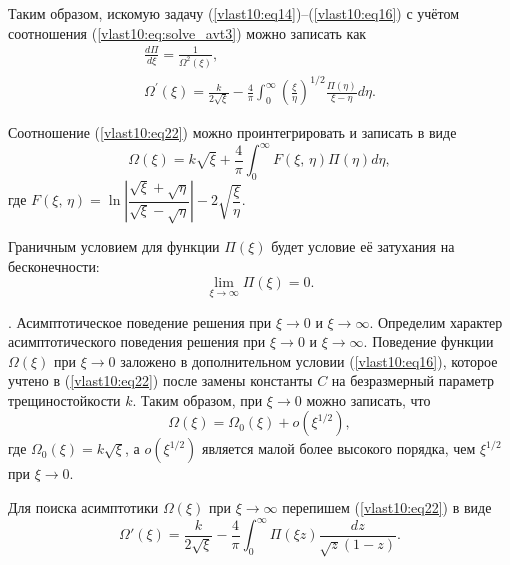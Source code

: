 Таким образом, искомую задачу (\ref{vlast10:eq14})--(\ref{vlast10:eq16}) с учётом соотношения (\ref{vlast10:eq:solve_avt3}) можно записать как
\begin{gather}
\frac{d\Pi}{d\xi}=\frac{1}{\Omega^{2}\left(\xi\right)},\label{vlast10:eq21}\\
\Omega^{\prime}(\xi)=\frac{k}{2\sqrt{\xi}}-\frac{4}{\pi}\int _{0}^{\infty}\left(\frac{\xi}{\eta}\right)^{1/2}\frac{\Pi (\eta)}{\xi-\eta}d\eta.\label{vlast10:eq22}
\end{gather}

Соотношение (\ref{vlast10:eq22}) можно проинтегрировать и записать в виде
\begin{equation}
\Omega(\xi)=k\sqrt{\xi}+\dfrac{4}{\pi}\int _{0}^{\infty}F(\xi,\,\eta)\Pi(\eta)d\eta,\label{vlast10:eq:solve_avt6}
\end{equation}
где $F(\xi,\,\eta)=\ln\left|\dfrac{\sqrt{\xi}+\sqrt{\eta}}{\sqrt{\xi}-\sqrt{\eta}}\right|-2\sqrt{\dfrac{\xi}{\eta}}$.

Граничным условием для функции $\Pi(\xi)$ будет условие её затухания на бесконечности:
\begin{equation}
\lim_{\xi\to\infty}\Pi(\xi)=0.\label{vlast10:eq24}
\end{equation}

{\small {}. Асимптотическое поведение решения при $\xi\to0$ и $\xi\to\infty$}.
Определим характер асимптотического поведения решения при
$\xi  \to 0$ и $\xi  \to
\infty $. Поведение функции $\Omega (\xi)$ при $\xi  \to 0$
заложено в дополнительном условии (\ref{vlast10:eq16}), которое учтено в (\ref{vlast10:eq22}) после замены константы $C$
на безразмерный параметр трещиностойкости $k$.
Таким образом, при $\xi  \to 0$ можно
записать, что
\begin{equation}
\Omega ( \xi ) = {\Omega _0}( \xi) + o( \xi^{1/2}),\label{vlast10:eq25}
\end{equation}
где  ${\Omega _0} ( \xi ) =
k \sqrt \xi $, а $o ( \xi ^{1/2})$ является малой более высокого порядка, чем
${\xi ^{1/2}}$ при $\xi \to 0$.

Для поиска асимптотики $\Omega ( \xi )$ при $\xi  \to \infty $
перепишем (\ref{vlast10:eq22})
в виде
\begin{equation}
\Omega ' ( \xi ) = \frac{k}{{2\sqrt \xi}}
- \frac{4}{\pi }\int _0^\infty  \Pi ( \xi z)\frac{{dz}}{{\sqrt z ( 1 - z)}}. \label{vlast10:eq26}
\end{equation}

